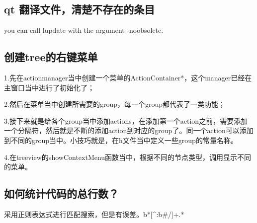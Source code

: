 \subsection{qt 翻译文件，清楚不存在的条目}
you can call lupdate with the argument -noobsolete. 
\subsection{创建tree的右键菜单}
1.先在actionmanager当中创建一个菜单的ActionContainer*，这个manager已经在主窗口当中进行了初始化了；

2.然后在菜单当中创建所需要的group，每一个group都代表了一类功能；

3.接下来就是给各个group当中添加actions，在添加第一个action之前，需要添加一个分隔符，然后就是不断的添加action到对应的group了。同一个action可以添加到不同的group当中。小技巧就是，在h文件当中定义一些group的常量名称。

4.在treeview的showContextMenu函数当中，根据不同的节点类型，调用显示不同的菜单。
\subsection{如何统计代码的总行数？}
采用正则表达式进行匹配搜索，但是有误差。b*[^:b#/]+.*